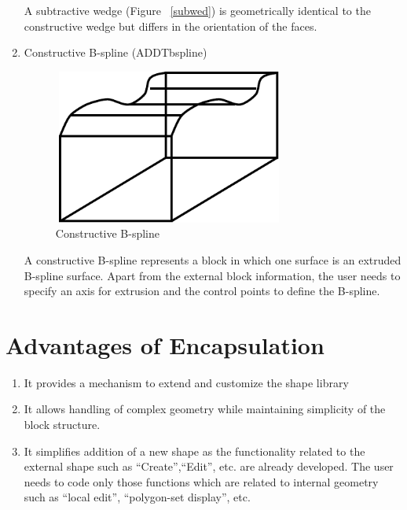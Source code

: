 \begin{enumerate}
        A subtractive wedge (Figure ~\ref{subwed}) is geometrically identical
		to the constructive wedge but differs in the orientation of the
        faces.

    \item
    Constructive B-spline (ADDTbspline)

        \begin{figure}[htbp]
                     \hspace{4cm}
         \includegraphics[width=3.0in,height=2.0in]{ADDBSP.pdf}
            \caption{Constructive B-spline}
            \label{addbsp}

        \end{figure}

        A constructive B-spline represents a block in which one surface is an
		extruded B-spline surface. Apart
        from the external block information, the user needs to specify an axis 
		for extrusion and the control points to define the B-spline.

    \end{enumerate}

	\section{Advantages of Encapsulation}
		\begin{enumerate}
			\item
			It provides a mechanism to extend and customize the shape library
			\item
			It allows handling of complex geometry while maintaining simplicity
			of the block structure.
			\item
			It simplifies addition of a new shape as the functionality related
			to the external shape such as ``Create'',``Edit'', etc. are
			already developed. The user needs to code only those functions
			which are related to internal geometry such as ``local edit'',
			``polygon-set display'', etc.
		\end{enumerate}
